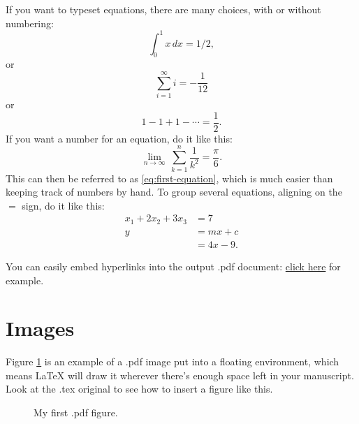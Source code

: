 \documentclass[12pt]{amsart}   %
\begin{document}
If you want to typeset equations, there are many choices, with or without numbering:
\[
\int_0^1 x\, dx = 1/2,
\]
or
$$
\sum_{i = 1}^\infty i = -\frac{1}{12}
$$
or
\begin{equation*}
1 - 1 + 1 - \cdots = \frac{1}{2}.
\end{equation*}
If you want a number for an equation, do it like this:
\begin{equation}\label{eq:first-equation}
\lim_{n \to \infty}\, \sum_{k = 1}^n \frac{1}{k^2} = \frac{\pi}{6}.
\end{equation} %
This can then be referred to as \eqref{eq:first-equation}, which is much easier than
keeping track of numbers by hand. To group several equations, aligning on the $=$ sign, do
it like this:
\begin{align*}
x_1 + 2x_2 + 3x_3 &= 7 \\ y &= mx + c \\ &= 4x - 9.
\end{align*}

You can easily embed hyperlinks into the output .pdf document: 
\href{http://stellar.mit.edu/S/course/18/sp13/18.821/}{click here} for example.

\section{Images}
Figure \ref{fig:2} is an example of a .pdf image put into a floating environment, which means LaTeX will draw it wherever there's enough space left in your manuscript.  %
Look at the .tex original to see how to insert a figure like this. 

\begin{figure}
\begin{center}
\end{center}
\vspace*{-.5in} %
\caption{My first .pdf figure.\label{fig:2}}
\end{figure}
\end{document}
